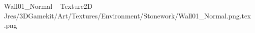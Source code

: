 
   Wall01_Normal             	   Texture2D
   J   res/3DGamekit/Art/Textures/Environment/Stonework/Wall01_Normal.png.tex.png